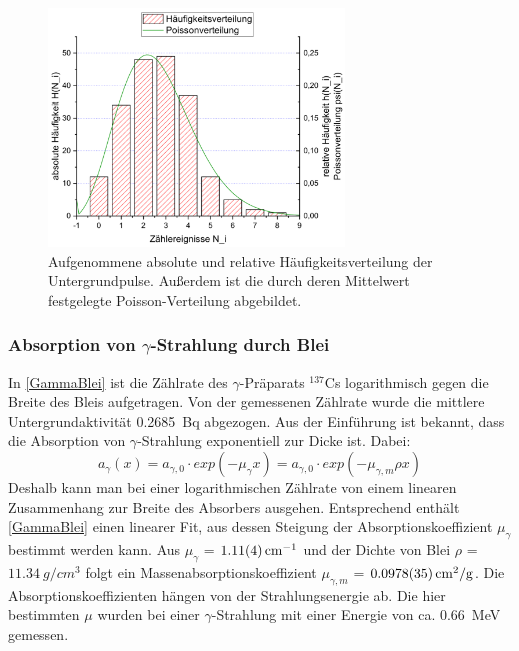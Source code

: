 \documentclass[
	a4paper,
	12pt,
	pagesize,
	ngerman
]{scrartcl}
\begin{document}
	\begin{figure}[H]
		\includegraphics[width=0.7\textwidth]{Untergrund}
		\centering
		\caption{Aufgenommene absolute und relative Häufigkeitsverteilung der Untergrundpulse. Außerdem ist die durch deren Mittelwert festgelegte Poisson-Verteilung abgebildet.}%
		\label{Untergrund}
		\centering
	\end{figure}

	\subsubsection{Absorption von $\gamma$-Strahlung durch Blei} \label{blei}
	In \cref{GammaBlei} ist die Zählrate des $\gamma$-Präparats $ ^{137}$Cs logarithmisch gegen die Breite des Bleis aufgetragen. 
	Von der gemessenen Zählrate wurde die mittlere Untergrundaktivität \SI{0,2685}{Bq} abgezogen.
	Aus der Einführung ist bekannt, dass die Absorption von $\gamma$-Strahlung exponentiell zur Dicke ist.
	Dabei:
	\begin{equation}
		a_{\gamma}(x) = a_{\gamma,0} \cdot exp(-\mu_\gamma x)= a_{\gamma,0} \cdot exp(-\mu_{\gamma,m} \rho x)
		\label{gamma}
	\end{equation}
	 Deshalb kann man bei einer logarithmischen Zählrate von einem linearen Zusammenhang zur Breite des Absorbers ausgehen. 
	 Entsprechend enthält \cref{GammaBlei} einen linearer Fit, aus dessen Steigung der Absorptionskoeffizient $\mu_\gamma$ bestimmt werden kann.
	 Aus $\mu_\gamma$ = $\SI{1,11 +- 0,04}{cm^{-1}}$ und der Dichte von Blei $\rho$ = $\SI{11,34}{g/cm^3}$ folgt ein Massenabsorptionskoeffizient $\mu_{\gamma,m}$ = $\SI{0,0978+-0,0035}{cm^2/g}$.\cite{dichten}
	 Die Absorptionskoeffizienten hängen von der Strahlungsenergie ab. 
	 Die hier bestimmten $\mu$ wurden bei einer $\gamma$-Strahlung mit einer Energie von ca. \SI{0,66}{MeV} gemessen.
	 
\end{document}
